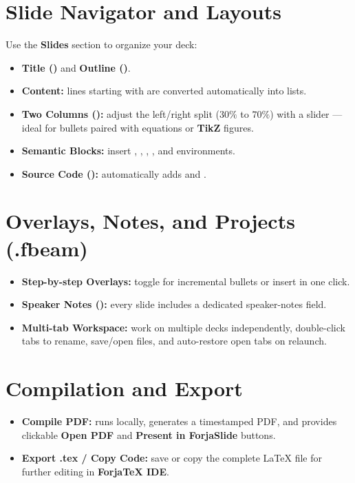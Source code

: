 \documentclass[11pt,a4paper]{article}
\begin{document}
\section{Slide Navigator and Layouts}
Use the \textbf{Slides} section to organize your deck:
\begin{itemize}
  \item \textbf{Title ()} and \textbf{Outline ()}.
  \item \textbf{Content:} lines starting with \code{- } are converted automatically into  lists.
  \item \textbf{Two Columns ():} adjust the left/right split ($30\%$ to $70\%$) with a slider --- ideal for bullets paired with equations or \textbf{TikZ} figures.
  \item \textbf{Semantic Blocks:} insert , , , , and  environments.
  \item \textbf{Source Code ():} automatically adds \code{[fragile]} and .
\end{itemize}

\section{Overlays, Notes, and Projects (.fbeam)}
\begin{itemize}
  \item \textbf{Step-by-step Overlays:} toggle \code{[<+->]} for incremental bullets or insert  in one click.
  \item \textbf{Speaker Notes ():} every slide includes a dedicated speaker-notes field.
  \item \textbf{Multi-tab Workspace:} work on multiple decks independently, double-click tabs to rename, save/open  files, and auto-restore open tabs on relaunch.
\end{itemize}

\section{Compilation and Export}
\begin{itemize}
  \item \textbf{Compile PDF:} runs  locally, generates a timestamped PDF, and provides clickable \textbf{Open PDF} and \textbf{Present in ForjaSlide} buttons.
  \item \textbf{Export .tex / Copy Code:} save or copy the complete \LaTeX{} file for further editing in \textbf{ForjaTeX IDE}.
\end{itemize}
\end{document}
